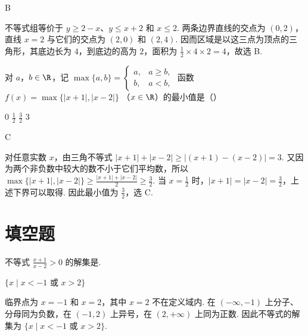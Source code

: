 \begin{answer}
B
\end{answer}

\begin{solution}
不等式组等价于 \(y\geqslant2-x\)、\(y\leqslant x+2\) 和 \(x\leqslant2\). 两条边界直线的交点为 \((0,2)\)，直线 \(x=2\) 与它们的交点为 \((2,0)\) 和 \((2,4)\). 因而区域是以这三点为顶点的三角形，其底边长为 \(4\)，到底边的高为 \(2\)，面积为 \(\frac12\times4\times2=4\)，故选 B.
\end{solution}

\begin{problem}
对 \(a\)，\(b \in \R\)，记 \(\max \{a, b\} = \begin{cases}
a, & a \geqslant b,\\
b, & a < b,
\end{cases}\) 函数 \(f(x) = \max \{|x + 1|, |x - 2|\}\) （\(x \in \R\)）的最小值是（\quad）

\choices
    {\(0\)}
    {\(\frac{1}{2}\)}
    {\(\frac{3}{2}\)}
    {\(3\)}
\end{problem}

\begin{answer}
C
\end{answer}

\begin{solution}
对任意实数 \(x\)，由三角不等式
\(\lvert x+1\rvert+\lvert x-2\rvert\geqslant\lvert(x+1)-(x-2)\rvert=3\). 又因为两个非负数中较大的数不小于它们平均数，所以
\(\max\{\lvert x+1\rvert,\lvert x-2\rvert\}\geqslant\frac{\lvert x+1\rvert+\lvert x-2\rvert}{2}\geqslant\frac32\). 当 \(x=\frac12\) 时，\(\lvert x+1\rvert=\lvert x-2\rvert=\frac32\)，上述下界可以取得. 因此最小值为 \(\frac32\)，选 C.
\end{solution}

\section{填空题}
\begin{problem}
不等式 \(\frac{x + 1}{x - 2} > 0\) 的解集是\fillinblank{}.
\end{problem}

\begin{answer}
\(\{x \mid x < -1\text{ 或 }x > 2\}\)
\end{answer}

\begin{solution}
临界点为 \(x=-1\) 和 \(x=2\)，其中 \(x=2\) 不在定义域内. 在 \((-\infty,-1)\) 上分子、分母同为负数，在 \((-1,2)\) 上异号，在 \((2,+\infty)\) 上同为正数. 因此不等式的解集为 \(\{x\mid x<-1\text{ 或 }x>2\}\).
\end{solution}

